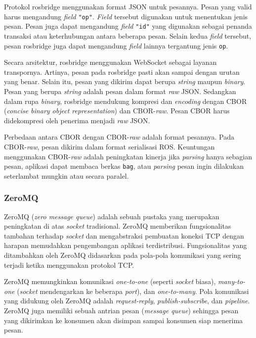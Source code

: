 Protokol rosbridge menggunakan format JSON untuk pesannya. Pesan yang valid
harus mengandung \textit{field} \texttt{"op"}. \textit{Field} tersebut digunakan
untuk menentukan jenis pesan. Pesan juga dapat mengandung \textit{field}
\texttt{"id"} yang digunakan sebagai penanda transaksi atau keterhubungan antara
beberapa pesan. Selain kedua \textit{field} tersebut, pesan rosbridge juga dapat
mengandung \textit{field} lainnya tergantung jenis \texttt{op}.

Secara arsitektur, rosbridge menggunakan WebSocket sebagai layanan
trans\-por\-nya. Artinya, pesan pada rosbridge pasti akan sampai dengan urutan
yang benar. Selain itu, pesan yang dikirim dapat berupa \textit{string} maupun
\textit{binary}. Pesan yang berupa \textit{string} adalah pesan dalam format
\textit{raw} JSON. Sedangkan dalam rupa \textit{binary}, rosbridge mendukung
kompresi dan \textit{encoding} dengan CBOR (\textit{concise binary object
	representation}) dan CBOR-\textit{raw}. Pesan CBOR harus didekompresi oleh
penerima menjadi \textit{raw} JSON.

Perbedaan antara CBOR dengan CBOR-\textit{raw} adalah format pesannya. Pada
CBOR-\textit{raw}, pesan dikirim dalam format serialisasi ROS. Keuntungan
menggunakan C\-B\-O\-R-\textit{raw} adalah peningkatan kinerja jika \textit{parsing}
hanya sebagian pesan, aplikasi dapat membaca berkas \texttt{bag}, atau
\textit{parsing} pesan ingin dilakukan seterlambat mungkin atau secara paralel.

\subsubsection{ZeroMQ}

ZeroMQ (\textit{zero message queue}) adalah sebuah pustaka yang merupakan
pe\-ning\-ka\-tan di atas \textit{socket} tradisional. ZeroMQ memberikan
fungsionalitas tambahan terhadap \textit{socket} dan mengabstraksi pembuatan
koneksi TCP dengan harapan memudahkan pengembangan aplikasi terdistribusi.
Fungsionalitas yang ditambahkan oleh ZeroMQ didasarkan pada pola-pola komunikasi
yang sering terjadi ketika menggunakan protokol TCP.

ZeroMQ memungkinkan komunikasi \textit{one-to-one} (seperti \textit{socket}
biasa), \textit{many-to-one} (\textit{socket} mendengarkan ke beberapa
\textit{port}), dan \textit{one-to-many}. Pola komunikasi yang didukung oleh
ZeroMQ adalah \textit{request-reply}, \textit{publish-subscribe}, dan
\textit{pipeline}. ZeroMQ juga memiliki sebuah antrian pesan (\textit{message
	queue}) sehingga pesan yang dikirimkan ke konsumen akan disimpan
sampai konsumen siap menerima pesan.

